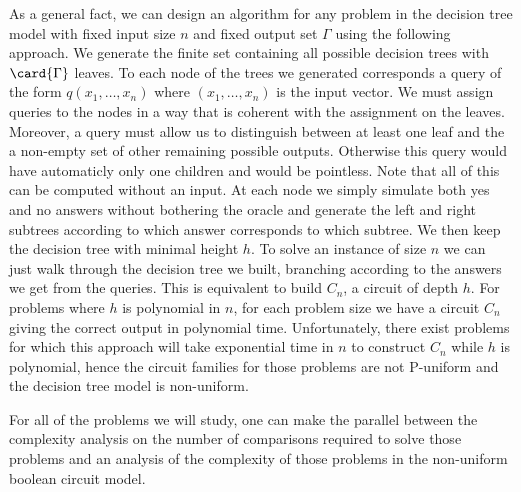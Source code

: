 As a general fact, we can design an algorithm for any problem in the decision
tree model with fixed input size \(n\) and fixed output set \(\Gamma\) using
the following approach. We generate the finite set containing all possible
decision trees with \(\card{\Gamma}\) leaves. To each node of the trees we
generated corresponds a query of the form \(q(x_1,\ldots,x_n)\) where
\((x_1,\ldots,x_n)\) is the input vector. We must assign queries to the nodes
in a way that is coherent with the assignment on the leaves. Moreover, a query
must allow us to distinguish between at least one leaf and the a non-empty set
of other remaining possible outputs. Otherwise this query would have
automaticly only one children and would be pointless. Note that all of this can
be computed without an input. At each node we simply simulate both yes and no
answers without bothering the oracle and generate the left and right subtrees
according to which answer corresponds to which subtree. We then keep the
decision tree with minimal height \(h\). To solve an instance of size \(n\) we
can just walk through the decision tree we built, branching according to the
answers we get from the queries. This is equivalent to build \(C_n\), a circuit
of depth \(h\). For problems where \(h\) is polynomial in \(n\), for each
problem size we have a circuit \(C_n\) giving the correct output in polynomial
time. Unfortunately, there exist problems for which this approach will take
exponential time in \(n\) to construct \(C_n\) while \(h\) is polynomial, hence
the circuit families for those problems are not P-uniform and the decision tree
model is non-uniform.

For all of the problems we will study, one can make the parallel between the
complexity analysis on the number of comparisons required to solve those
problems and an analysis of the complexity of those problems in the non-uniform
boolean circuit model.
